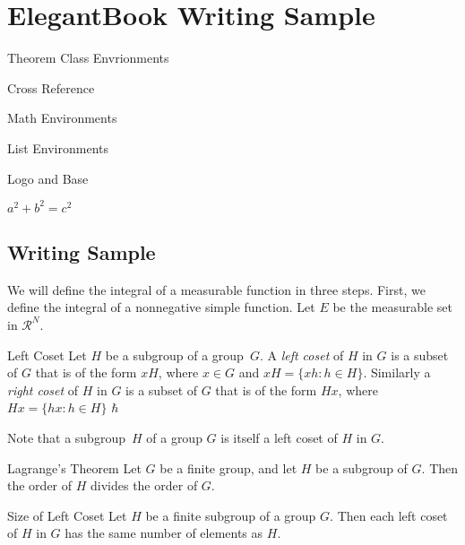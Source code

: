 \documentclass[fancy,blue,11pt]{elegantbook}
\begin{document}
\chapter{ElegantBook Writing Sample}

\begin{introduction}
\item Theorem Class Envrionments
\item Cross Reference
\item Math Environments
\item List Environments
\item Logo and Base 
\item $a^2+b^2=c^2$
\end{introduction}


\lipsum[1]

\section{Writing Sample}

We will define the integral of a measurable function in three steps. First, we define the integral of a nonnegative simple function. Let $E$ be the measurable set in $\mathcal{R}^N$.

\begin{definition}{Left Coset}{}
Let $H$ be a subgroup of a group~$G$.  A \emph{left coset} of $H$ in $G$ is a subset of $G$ that is of the form $xH$, where $x \in G$ and $xH = \{ xh : h \in H \}$. Similarly a \emph{right coset} of $H$ in $G$ is a subset of $G$ that is of the form $Hx$, where $Hx = \{ hx : h \in H \}$ $\hbar$
\end{definition}

\begin{note}
Note that a subgroup~$H$ of a group $G$ is itself a left coset of $H$ in $G$.
\end{note}

\lipsum[2]

\begin{theorem}{Lagrange's Theorem}{}
Let $G$ be a finite group, and let $H$ be a subgroup of $G$.  Then the order of $H$ divides the order of $G$.
\end{theorem}

\lipsum[3]

   
\begin{proposition}{Size of Left Coset}{}
Let $H$ be a finite subgroup of a group $G$.  Then each left coset of $H$ in $G$ has the same number of elements as $H$.
\end{proposition}
\end{document}
